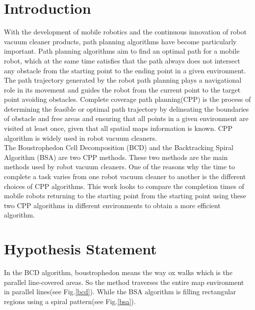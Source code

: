 \documentclass[conference]{IEEEtran}
\begin{document}
\section{Introduction}
\label{Sec1}
With the development of mobile robotics and the continuous innovation of robot vacuum cleaner products, path planning algorithms have become particularly important. Path planning algorithms aim to find an optimal path for a mobile robot, which at the same time satisfies that the path always does not intersect any obstacle from the starting point to the ending point in a given environment. The path trajectory generated by the robot path planning plays a navigational role in its movement and guides the robot from the current point to the target point avoiding obstacles. Complete coverage path planning(CPP) is the process of determining the feasible or optimal path trajectory by delineating the boundaries of obstacle and free areas and ensuring that all points in a given environment are visited at least once, given that all spatial maps information is known. CPP algorithm is widely used in robot vacuum cleaners\cite{colegrave1994case}.\\
The Boustrophedon Cell Decomposition (BCD)\cite{lavalle2006planning} and the Backtracking Spiral Algorithm (BSA)\cite{gonzalez2005bsa} are two CPP methods. These two methods are the main methods used by robot vacuum cleaners. One of the reasons why the time to complete a task varies from one robot vacuum cleaner to another is the different choices of CPP algorithms. This work looks to compare the completion times of mobile robots returning to the starting point from the starting point using these two CPP algorithms in different environments to obtain a more efficient algorithm.

\section{Hypothesis Statement}
In the BCD algorithm, boustrophedon\cite{choset1998coverage} means the way ox walks which is the parallel line-covered areas. So the method traverses the entire map environment in parallel lines(see Fig.\ref{bcd}). While the BSA algorithm\cite{Gonzlez2003BSAAC} is filling rectangular regions using a spiral pattern(see Fig.\ref{bsa}).\\
\end{document}
